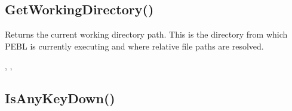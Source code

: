 \documentclass[letterpaper,10pt,english]{sphinxmanual}
\begin{document}
\ignorespaces 

\subsection{GetWorkingDirectory()}
\label{\detokenize{reference/peblenvironment:getworkingdirectory}}\label{\detokenize{reference/peblenvironment:index-29}}
\sphinxAtStartPar
{}

\sphinxAtStartPar
{}

\sphinxAtStartPar
Returns the current working directory path. This is the directory from which PEBL is currently executing and where relative file paths are resolved.

\sphinxAtStartPar
{}

\begin{sphinxVerbatim}[commandchars=\\\{\}]
\end{sphinxVerbatim}

\sphinxAtStartPar
{}

\begin{sphinxVerbatim}[commandchars=\\\{\}]
\end{sphinxVerbatim}

\sphinxAtStartPar
{}

\sphinxAtStartPar
{}, , 

\ignorespaces 

\subsection{IsAnyKeyDown()}
\label{\detokenize{reference/peblenvironment:isanykeydown}}\label{\detokenize{reference/peblenvironment:index-30}}
\sphinxAtStartPar
{}
\end{document}
